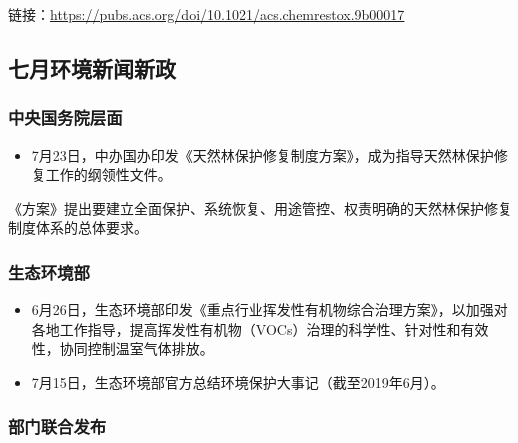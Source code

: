 \documentclass[
]{book}
\providecommand{\tightlist}{%
  \setlength{\itemsep}{0pt}\setlength{\parskip}{0pt}}
\begin{document}
链接：\url{https://pubs.acs.org/doi/10.1021/acs.chemrestox.9b00017}

\hypertarget{ux4e03ux6708ux73afux5883ux65b0ux95fbux65b0ux653f}{%
\subsection*{七月环境新闻新政}\label{ux4e03ux6708ux73afux5883ux65b0ux95fbux65b0ux653f}}

\hypertarget{ux4e2dux592eux56fdux52a1ux9662ux5c42ux9762-4}{%
\subsubsection*{中央国务院层面}\label{ux4e2dux592eux56fdux52a1ux9662ux5c42ux9762-4}}

\begin{itemize}
\tightlist
\item
  7月23日，中办国办印发《天然林保护修复制度方案》，成为指导天然林保护修复工作的纲领性文件。
\end{itemize}

《方案》提出要建立全面保护、系统恢复、用途管控、权责明确的天然林保护修复制度体系的总体要求。

\hypertarget{ux751fux6001ux73afux5883ux90e8-5}{%
\subsubsection*{生态环境部}\label{ux751fux6001ux73afux5883ux90e8-5}}

\begin{itemize}
\item
  6月26日，生态环境部印发《重点行业挥发性有机物综合治理方案》，以加强对各地工作指导，提高挥发性有机物（VOCs）治理的科学性、针对性和有效性，协同控制温室气体排放。
\item
  7月15日，生态环境部官方总结环境保护大事记（截至2019年6月）。
\end{itemize}

\hypertarget{ux90e8ux95e8ux8054ux5408ux53d1ux5e03-7}{%
\subsubsection*{部门联合发布}\label{ux90e8ux95e8ux8054ux5408ux53d1ux5e03-7}}
\end{document}
